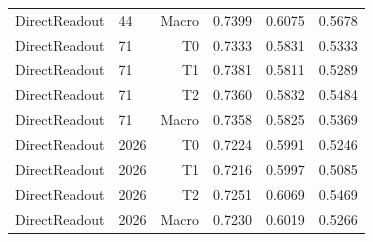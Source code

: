 \begin{table}[t]
\begin{tabular}{llrrrr}
DirectReadout & 44 & Macro & 0.7399 & 0.6075 & 0.5678 \\
DirectReadout & 71 & T0 & 0.7333 & 0.5831 & 0.5333 \\
DirectReadout & 71 & T1 & 0.7381 & 0.5811 & 0.5289 \\
DirectReadout & 71 & T2 & 0.7360 & 0.5832 & 0.5484 \\
DirectReadout & 71 & Macro & 0.7358 & 0.5825 & 0.5369 \\
DirectReadout & 2026 & T0 & 0.7224 & 0.5991 & 0.5246 \\
DirectReadout & 2026 & T1 & 0.7216 & 0.5997 & 0.5085 \\
DirectReadout & 2026 & T2 & 0.7251 & 0.6069 & 0.5469 \\
DirectReadout & 2026 & Macro & 0.7230 & 0.6019 & 0.5266 \\
\bottomrule
\end{tabular}
\end{table}

